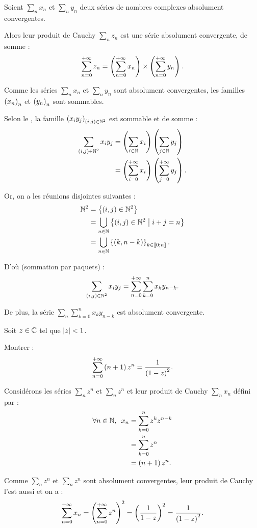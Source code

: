 \begin{theo}
Soient \(\sum_nx_n\) et \(\sum_ny_n\) deux séries de nombres complexes absolument convergentes.

Alors leur produit de Cauchy \(\sum_nz_n\) est une série absolument convergente, de somme : \[\sum_{n=0}^{+\infty}z_n=\left(\sum_{n=0}^{+\infty}x_n\right)\times\left(\sum_{n=0}^{+\infty}y_n\right).\]
\end{theo}

\begin{dem}
Comme les séries \(\sum_nx_n\) et \(\sum_ny_n\) sont absolument convergentes, les familles \(\left(x_n\right)_n\) et \(\left(y_n\right)_n\) sont sommables.

Selon le , la famille \(\left(x_iy_j\right)_{\left(i,j\right)\in\mathbb{N}^2}\) est sommable et de somme : \[\begin{aligned}
\sum_{\left(i,j\right)\in\mathbb{N}^2}x_iy_j&=\left(\sum_{i\in\mathbb{N}}x_i\right)\left(\sum_{j\in\mathbb{N}}y_j\right) \\
&=\left(\sum_{i=0}^{+\infty}x_i\right)\left(\sum_{j=0}^{+\infty}y_j\right).
\end{aligned}\]

Or, on a les réunions disjointes suivantes : \[\begin{aligned}
\mathbb{N}^2&=\left\lbrace\left(i,j\right)\in\mathbb{N}^2\right\rbrace \\
&=\bigcup_{n\in\mathbb{N}}\left\lbrace\left(i,j\right)\in\mathbb{N}^2\;\middle|\; i+j=n\right\rbrace \\
&=\bigcup_{n\in\mathbb{N}}\left\lbrace\left(k,n-k\right)\right\rbrace_{k\in\left\llbracket0;n\right\rrbracket}.
\end{aligned}\]

D'où (sommation par paquets) : \[\sum_{\left(i,j\right)\in\mathbb{N}^2}x_iy_j=\sum_{n=0}^{+\infty}\sum_{k=0}^nx_ky_{n-k}.\]

De plus, la série \(\sum_n\sum_{k=0}^nx_ky_{n-k}\) est absolument convergente.
\end{dem}

\begin{exoex}
Soit \(z\in\mathbb{C}\) tel que \(\left\lvert z\right\rvert<1\).

Montrer : \[\sum_{n=0}^{+\infty}\left(n+1\right)z^n=\dfrac{1}{\left(1-z\right)^2}.\]
\end{exoex}

\begin{corr}
Considérons les séries \(\sum_nz^n\) et \(\sum_nz^n\) et leur produit de Cauchy \(\sum_nx_n\) défini par : \[\begin{aligned}
\quantifs{\forall n\in\N}x_n&=\sum_{k=0}^nz^kz^{n-k} \\
&=\sum_{k=0}^nz^n \\
&=\paren{n+1}z^n.
\end{aligned}\]

Comme \(\sum_nz^n\) et \(\sum_nz^n\) sont absolument convergentes, leur produit de Cauchy l'est aussi et on a : \[\sum_{n=0}^{+\infty}x_n=\left(\sum_{n=0}^{+\infty}z^n\right)^2=\left(\dfrac{1}{1-z}\right)^2=\dfrac{1}{\left(1-z\right)^2}.\]
\end{corr}


